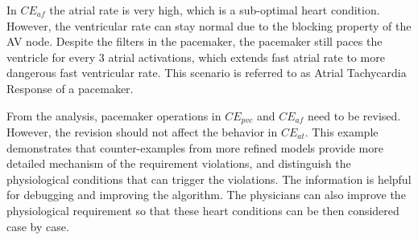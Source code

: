 In $CE_{af}$ the atrial rate is very high, which is a sub-optimal heart condition. However, the ventricular rate can stay normal due to the blocking property of the AV node. Despite the filters in the pacemaker, the pacemaker still paces the ventricle for every 3 atrial activations, which extends fast atrial rate to more dangerous fast ventricular rate. This scenario is referred to as Atrial Tachycardia Response of a pacemaker. 

From the analysis, pacemaker operations in $CE_{pvc}$ and $CE_{af}$ need to be revised. However, the revision should not affect the behavior in $CE_{at}$. This example demonstrates that counter-examples from more refined models provide more detailed mechanism of the requirement violations, and distinguish the physiological conditions that can trigger the violations. The information is helpful for debugging and improving the algorithm. The physicians can also improve the physiological requirement so that these heart conditions can be then considered case by case. %
%
 




